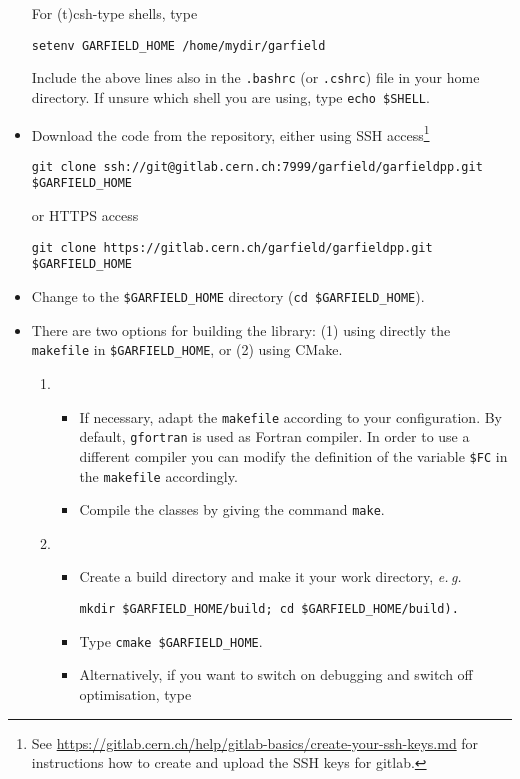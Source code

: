 \begin{itemize}
  For (t)csh-type shells, type
  \begin{lstlisting}
setenv GARFIELD_HOME /home/mydir/garfield
  \end{lstlisting}
  Include the above lines also in the \texttt{.bashrc} 
  (or \texttt{.cshrc}) file in your home directory. 
  If unsure which shell you are using, 
  type \texttt{echo \${SHELL}}.
  \item
  Download the code from the repository, either 
  using SSH access\footnote{See \url{https://gitlab.cern.ch/help/gitlab-basics/create-your-ssh-keys.md}
for instructions how to create and upload the SSH keys for gitlab.} 
  \begin{lstlisting}
git clone ssh://git@gitlab.cern.ch:7999/garfield/garfieldpp.git $GARFIELD_HOME
  \end{lstlisting}
  or HTTPS access
  \begin{lstlisting}
git clone https://gitlab.cern.ch/garfield/garfieldpp.git $GARFIELD_HOME
  \end{lstlisting}
  \item
  Change to the \texttt{\${GARFIELD\_HOME}} directory 
  (\texttt{cd \$GARFIELD\_HOME}).
  \item
  There are two options for building the library: (1) using directly the 
  \texttt{makefile} in \texttt{\${GARFIELD\_HOME}}, or (2) using CMake.
  \begin{enumerate}
  \item
  \begin{itemize}
  \item 
  If necessary, adapt the \texttt{makefile} according 
  to your configuration. 
  By default, \texttt{gfortran} is used as Fortran compiler. 
  In order to use a different compiler 
  you can modify the definition of the variable \texttt{\$FC} in the 
  \texttt{makefile} accordingly.
  \item
  Compile the classes by giving the command \texttt{make}.
  \end{itemize}
  \item
  \begin{itemize}
  \item
  Create a build directory and make it your work directory, \textit{e.\,g.}
  \begin{lstlisting}
mkdir $GARFIELD_HOME/build; cd $GARFIELD_HOME/build).
  \end{lstlisting}
  \item
  Type \texttt{cmake \$GARFIELD\_HOME}.
  \item
  Alternatively, if you want to switch on debugging and switch off optimisation, type 

\end{itemize}
\end{enumerate}
\end{itemize}
